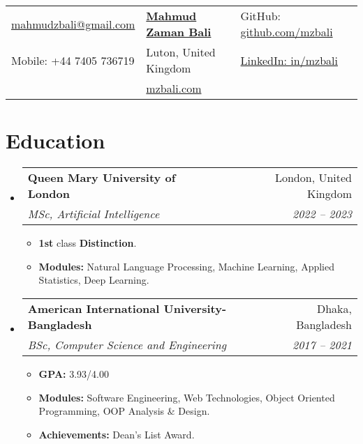 \documentclass[letterpaper,11pt]{article}
\makeatletter
\newcommand{\resumeItem}[1]{
  \item\small{
    {#1 \vspace{-2pt}}
  }
}
\newcommand{\resumeSubheading}[4]{
  \vspace{-2pt}\item
    \begin{tabular*}{0.97\textwidth}[t]{l@{\extracolsep{\fill}}r}
      \textbf{#1} & #2 \\
      \textit{\small#3} & \textit{\small #4} \\
    \end{tabular*}\vspace{-7pt}
}
\newcommand{\resumeSubHeadingListStart}{\begin{itemize}[leftmargin=0.15in, label={}]}
\newcommand{\resumeSubHeadingListEnd}{\end{itemize}}
\newcommand{\resumeItemListStart}{\begin{itemize}}
\newcommand{\resumeItemListEnd}{\end{itemize}\vspace{-5pt}}
\makeatother
\begin{document}

\begin{tabularx}{\textwidth}{>{\raggedright\arraybackslash}X >{\centering\arraybackslash}X >{\raggedleft\arraybackslash}X}
    \href{mailto:mahmudzbali@gmail.com}{mahmudzbali@gmail.com} & \textbf{\href{https://mzbali.com/}{\Large Mahmud Zaman Bali}} & GitHub: \href{https://github.com/mzbali}{github.com/mzbali} \\
    Mobile: +44 7405 736719 & Luton, United Kingdom & \href{https://www.linkedin.com/in/mzbali/}{LinkedIn: in/mzbali} \\
    & \href{https://mzbali.com/}{mzbali.com} & \\
\end{tabularx}





\section{Education}
  \resumeSubHeadingListStart
    \resumeSubheading
      {Queen Mary University of London}{London, United Kingdom}
      {MSc, Artificial Intelligence}{2022 -- 2023}
      \resumeItemListStart
        \resumeItem{\textbf{1st} class \textbf{Distinction}.}
        \resumeItem{\textbf{Modules:} Natural Language Processing, Machine Learning, Applied Statistics, Deep Learning.}
      \resumeItemListEnd
    \resumeSubheading
      {American International University-Bangladesh}{Dhaka, Bangladesh}
      {BSc, Computer Science and Engineering}{2017 -- 2021}
    \resumeItemListStart
        \resumeItem{\textbf{GPA:} 3.93/4.00}
        \resumeItem{\textbf{Modules:} Software Engineering, Web Technologies, Object Oriented Programming, OOP Analysis \& Design.}
        \resumeItem{\textbf{Achievements:} Dean’s List Award.}
    \resumeItemListEnd
  \resumeSubHeadingListEnd


\end{document}
